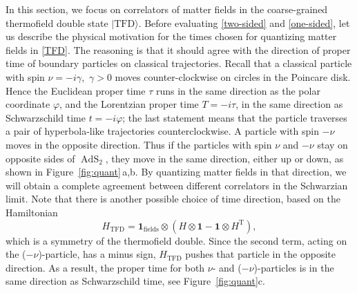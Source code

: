 \documentclass[11pt]{article}
\newcommand{\be}{\begin{equation}}
\newcommand{\ee}{\end{equation}}
\newcommand{\lt}{\left}
\newcommand{\rt}{\right}
\newcommand*{\ket}[1]{|{#1}\rangle}
\newcommand{\vp}{\varphi}
\newcommand{\Tt}{\mathrm{T}}
\DeclareMathOperator{\tAdS}{\widetilde{AdS}}
\newcommand{\unit}{\mathbf{1}}
\def\widetilde#1{#1}%
\begin{document}
In this section, we focus on correlators of matter fields in the coarse-grained thermofield double state $\ket{\text{TFD}}$. Before evaluating \eqref{two-sided} and \eqref{one-sided}, let us describe the physical motivation for the times chosen for quantizing matter fields in \eqref{TFD}. The reasoning is that it should agree with the direction of proper time of boundary particles on classical trajectories. Recall that a classical particle with spin $\nu=-i\gamma$,\, $\gamma>0$ moves counter-clockwise on circles in the Poincare disk. Hence the Euclidean proper time $\tau$ runs in the same direction as the polar coordinate $\vp$, and the Lorentzian proper time $T=-i\tau$, in the same direction as Schwarzschild time $t=-i\vp$; the last statement means that the particle traverses a pair of hyperbola-like trajectories counterclockwise. A particle with spin $-\nu$ moves in the opposite direction. Thus if the particles with spin $\nu$ and $-\nu$ stay on opposite sides of $\tAdS_2$, they move in the same direction, either up or down, as shown in Figure~\ref{fig:quant}\,a,b. By quantizing matter fields in that direction, we will obtain a complete agreement between different correlators in the Schwarzian limit. Note that there is another possible choice of time direction, based on the Hamiltonian
\be \label{H_TFD}
H_{\text{TFD}}=\unit_{\text{fields}} \otimes \lt(H \otimes \unit - \unit \otimes H^{\Tt}\rt),
\ee
which is a symmetry of the thermofield double. Since the second term, acting on the ($-\nu$)-particle, has a minus sign, $H_{\text{TFD}}$ pushes that particle in the opposite direction. As a result, the proper time for both $\nu$- and ($-\nu$)-particles is in the same direction as Schwarzschild time, see Figure~\ref{fig:quant}c.
\end{document}
